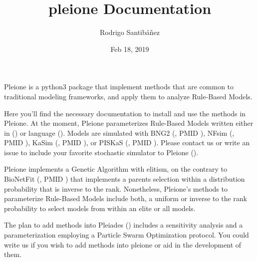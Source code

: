 \documentclass[letterpaper,10pt,english]{sphinxmanual}
\title{pleione Documentation}
\date{Feb 18, 2019}
\author{Rodrigo Santibáñez}
\begin{document}
\pagestyle{empty}
\sphinxmaketitle
\pagestyle{plain}
\sphinxtableofcontents
\pagestyle{normal}
\label{\detokenize{index::doc}}


Pleione is a python3 package that implement methods that are common to
traditional modeling frameworks, and apply them to analyze Rule-Based Models.

Here you’ll find the necessary documentation to install and use the methods in
Pleione. At the moment, Pleione parameterizes Rule-Based Models written
either in  () or  language (). Models are
simulated with BNG2 (, PMID ), NFsim (, PMID ), KaSim (, PMID ), or
PISKaS (, PMID ). Please contact us or write an issue to include your
favorite stochastic simulator to Pleione ().

Pleione implements a Genetic Algorithm with elitism, on the
contrary to BioNetFit (, PMID ) that implements a parents selection within
a distribution probability that is inverse to the rank. Nonetheless, Pleione’s
methods to parameterize Rule-Based Models include both, a uniform or inverse to the rank
probability to select models from within an elite or all models.

The plan to add methods into Pleiades () includes a sensitivity analysis and a
parameterization employing a Particle Swarm Optimization protocol. You
could write us if you wish to add methods into pleione or aid in the development
of them.
\end{document}
